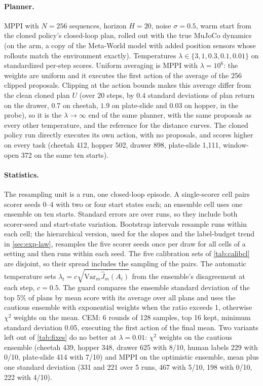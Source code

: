 \documentclass{article}
\theoremstyle{plain}
\theoremstyle{remark}
\newcommand{\Jh}{\hat{J}}
\newcommand{\Var}{\mathrm{Var}}
\begin{document}
\paragraph{Planner.} MPPI with $N=256$ sequences, horizon $H=20$, noise $\sigma=0.5$, warm start from the cloned
policy's closed-loop plan, rolled out with the true MuJoCo dynamics (on the arm, a copy of the Meta-World model with
added position sensors whose rollouts match the environment exactly). Temperatures
$\lambda\in\{3,1,0.3,0.1,0.01\}$ on standardized per-step scores. Uniform averaging is MPPI with $\lambda=10^6$:
the weights are uniform and it executes the first action of the average of the 256 clipped proposals. Clipping at the
action bounds makes this average differ from the clean cloned plan $U$ (over 20 steps, by $0.4$ standard deviations of
plan return on the drawer, $0.7$ on cheetah, $1.9$ on plate-slide and $0.03$ on hopper, in the probe), so it is the
$\lambda\to\infty$ end of the same planner, with the same proposals as every other temperature, and the reference for
the distance curves. The cloned policy run directly executes its own action, with no proposals, and scores higher on
every task (cheetah 412, hopper 502, drawer 898, plate-slide 1,111, window-open 372 on the same ten starts).

\paragraph{Statistics.} The resampling unit is a run, one closed-loop episode. A single-scorer cell pairs scorer seeds
0--4 with two or four start states each; an ensemble cell uses one ensemble on ten starts. Standard errors are over
runs, so they include both scorer-seed and start-state variation. Bootstrap intervals resample runs within each cell;
the hierarchical version, used for the slopes and the label-budget trend in \cref{sec:exp-law}, resamples the five
scorer seeds once per draw for all cells of a setting and then runs within each seed. The five calibration sets of \cref{tab:calibcl} are disjoint, so their spread includes the sampling of the
pairs. The automatic temperature sets
$\lambda_t=c\sqrt{\overline{\Var_m\Jh_m(A_i)}}$ from the ensemble's disagreement at each step, $c=0.5$. The guard
compares the ensemble standard deviation of the top 5\% of plans by mean score with its average over all plans and uses
the cautious ensemble with exponential weights when the ratio exceeds 1, otherwise $\chi^2$ weights on the mean. CEM:
6 rounds of 128 samples, top 16 kept, minimum standard deviation 0.05, executing the first action of the final mean. Two variants left out of \cref{tab:fixes} do no better at $\lambda=0.01$: $\chi^2$ weights on the cautious ensemble
(cheetah 439, hopper 348, drawer 625 with 8/10, human labels 229 with 0/10, plate-slide 414 with 7/10) and MPPI on the
optimistic ensemble, mean plus one standard deviation (331 and 221 over 5 runs, 467 with 5/10, 198 with 0/10, 222 with
4/10).
\end{document}

